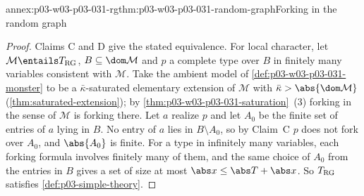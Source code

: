 \begin{annexitem}{annex:p03-w03-p03-031-rg}{thm:p03-w03-p03-031-random-graph}{Forking in the random graph}
\begin{proof}
Claims C and D give the stated equivalence.  For local character, let
\(\mathcal M\entails T_{\rm RG}\), \(B\subseteq\dom\mathcal M\) and \(p\) a
complete type over \(B\) in finitely many variables consistent with
\(\mathcal M\).  Take the ambient model of
\cref{def:p03-w03-p03-031-monster} to be a \(\bar\kappa\)-saturated
elementary extension of \(\mathcal M\) with \(\bar\kappa>\abs{\dom\mathcal
M}\) (\cref{thm:saturated-extension}); by
\cref{thm:p03-w03-p03-031-saturation}~(3) forking in the sense of
\(\mathcal M\) is forking there.  Let \(a\) realize \(p\) and let \(A_0\) be
the finite set of entries of \(a\) lying in \(B\).  No entry of \(a\) lies
in \(B\setminus A_0\), so by Claim~C \(p\) does not fork over \(A_0\), and
\(\abs{A_0}\) is finite.  For a type in infinitely many variables, each
forking formula involves finitely many of them, and the same choice of
\(A_0\) from the entries in \(B\) gives a set of size at most
\(\abs x\leq\abs T+\abs x\).  So \(T_{\rm RG}\) satisfies
\cref{def:p03-simple-theory}.
\end{proof}
\end{annexitem}
